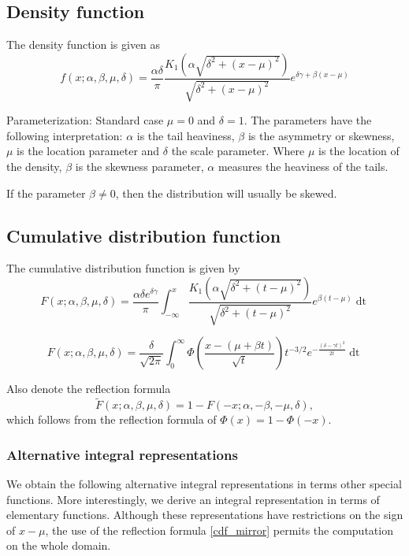 \documentclass[10pt,a4paper,oneside]{article}
\numberwithin{equation}{section}
\begin{document}
\subsection{Density function}
The density function is given as
\begin{equation}
f(x; \alpha, \beta, \mu, \delta) = \frac{\alpha \delta}{\pi} \frac{K_1\left(\alpha\sqrt{\delta^2 + (x-\mu)^2}\right)}{\sqrt{\delta^2 + (x-\mu)^2}} e^{\delta \gamma + \beta(x-\mu)}
\end{equation}

Parameterization: Standard case $\mu = 0$ and $\delta = 1$. The parameters have the following interpretation: $\alpha$ is the tail heaviness, $\beta$ is the asymmetry or skewness, $\mu$ is the location parameter and $\delta$ the scale parameter. Where $\mu$ is the location of the density, $\beta$ is the skewness parameter, $\alpha$ measures the heaviness of the tails.

If the parameter $\beta \neq 0$, then the distribution will usually be skewed.

\subsection{Cumulative distribution function}\label{properties_cdf}
The cumulative distribution function is given by
\begin{equation}\label{integral_k1}
F(x; \alpha, \beta, \mu, \delta) = \frac{\alpha \delta e^{\delta \gamma}}{\pi} \int_{-\infty}^{x} \frac{K_1\left(\alpha\sqrt{\delta^2 + (t-\mu)^2}\right)}{\sqrt{\delta^2 + (t-\mu)^2}} e^{\beta(t-\mu)} \mathop{dt}
\end{equation}

\begin{equation}\label{integral_phi}
F(x; \alpha, \beta, \mu, \delta) = \frac{\delta}{\sqrt{2\pi}}\int_{0}^{\infty} \Phi\left(\frac{x - (\mu +\beta t)}{\sqrt{t}}\right) t^{-3/2} e^{-\frac{(\delta - \gamma t)^2}{2t}} \mathop{dt}
\end{equation}

Also denote the reflection formula
\begin{equation}\label{cdf_mirror}
\tilde{F}(x; \alpha, \beta, \mu, \delta) = 1- F(-x; \alpha, -\beta, -\mu, \delta),
\end{equation}
which follows from the reflection formula of $\Phi(x) = 1 - \Phi(-x)$.

\subsubsection{Alternative integral representations}
We obtain the following alternative integral representations in terms other special functions. More interestingly, we derive an integral representation in terms of elementary functions. Although these representations have restrictions on the sign of $x-\mu$, the use of the reflection formula \eqref{cdf_mirror} permits the computation on the whole domain.
\end{document}
